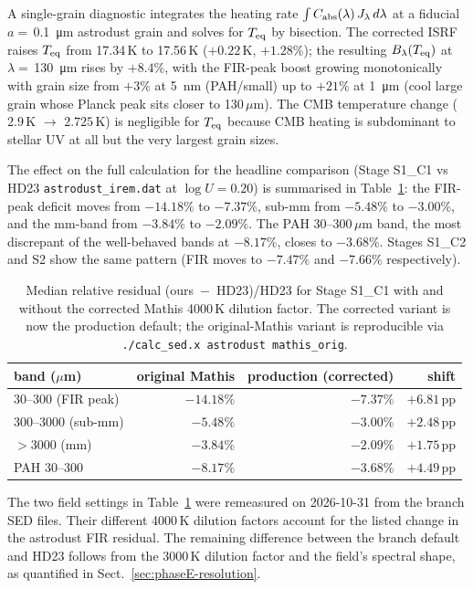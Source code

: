 \documentclass{my_memo}
\begin{document}
A single-grain diagnostic integrates the heating
rate $\int C_{\rm abs}(\lambda)\,J_\lambda\,d\lambda$ at a fiducial
$a = $\,\SI{0.1}{\micro\meter} astrodust grain and solves for
$T_{\rm eq}$ by bisection. The corrected ISRF raises $T_{\rm eq}$
from 17.34\,K to 17.56\,K ($+0.22$\,K, $+1.28\%$); the resulting
$B_\lambda(T_{\rm eq})$ at $\lambda = $\,\SI{130}{\micro\meter}
rises by $+8.4\%$, with the FIR-peak boost growing monotonically
with grain size from $+3\%$ at \SI{5}{nm} (PAH/small) up to
$+21\%$ at \SI{1}{\micro\meter} (cool large grain whose Planck
peak sits closer to 130\,$\mu$m). The CMB temperature change
($2.9$\,K $\to$ $2.725$\,K) is negligible for $T_{\rm eq}$ because
CMB heating is subdominant to stellar UV at all but the very
largest grain sizes.

The effect on the full calculation for the headline comparison (Stage S1\_C1
vs HD23 \texttt{astrodust\_irem.dat} at $\log U = 0.20$) is
summarised in Table~\ref{tab:mathis_c}: the FIR-peak deficit moves
from $-14.18\%$ to $-7.37\%$, sub-mm from $-5.48\%$ to $-3.00\%$,
and the mm-band from $-3.84\%$ to $-2.09\%$. The PAH 30--300\,$\mu$m
band, the most discrepant of the well-behaved bands at $-8.17\%$,
closes to $-3.68\%$. Stages S1\_C2 and S2 show the same pattern
(FIR moves to $-7.47\%$ and $-7.66\%$ respectively).

\begin{table}[h]
\centering
\begin{tabular}{l r r r}
\toprule
band ($\mu$m)              & original Mathis & production (corrected) & shift \\
\midrule
30--300 (FIR peak)         & $-14.18\%$ & $-7.37\%$  & $+6.81$\,pp \\
300--3000 (sub-mm)         & $-5.48\%$  & $-3.00\%$  & $+2.48$\,pp \\
$>3000$ (mm)               & $-3.84\%$  & $-2.09\%$  & $+1.75$\,pp \\
\midrule
PAH 30--300                & $-8.17\%$  & $-3.68\%$  & $+4.49$\,pp \\
\bottomrule
\end{tabular}
\caption{Median relative residual (ours~$-$~HD23)/HD23 for Stage
S1\_C1 with and without the corrected Mathis 4000\,K
dilution factor. The corrected variant is now the production
default; the original-Mathis variant is reproducible via
\texttt{./calc\_sed.x astrodust mathis\_orig}.}
\label{tab:mathis_c}
\end{table}

The two field settings in Table~\ref{tab:mathis_c} were
remeasured on 2026-10-31 from the branch SED files. Their different
4000\,K dilution factors account for the listed change in the
astrodust FIR residual. The remaining difference between the branch
default and HD23 follows from the 3000\,K dilution factor and the
field's spectral shape, as quantified in
Sect.~\ref{sec:phaseE-resolution}.
\end{document}
